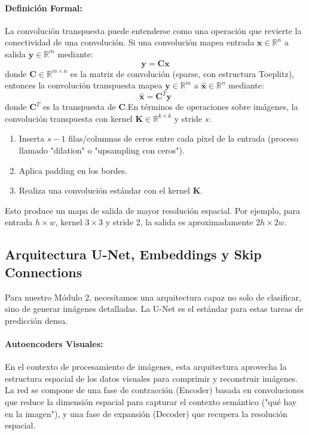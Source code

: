 \documentclass{article}
\begin{document}
\paragraph{Definición Formal:}
La convolución transpuesta puede entenderse como una operación que revierte la conectividad de una convolución. Si una convolución mapea entrada $\mathbf{x} \in \mathbb{R}^{n}$ a salida $\mathbf{y} \in \mathbb{R}^{m}$ mediante:
\begin{equation}
\mathbf{y} = \mathbf{C} \mathbf{x}
\end{equation}
donde $\mathbf{C} \in \mathbb{R}^{m \times n}$ es la matriz de convolución (sparse, con estructura Toeplitz), entonces la convolución transpuesta mapea $\mathbf{y} \in \mathbb{R}^{m}$ a $\hat{\mathbf{x}} \in \mathbb{R}^{n}$ mediante:
\begin{equation}
\hat{\mathbf{x}} = \mathbf{C}^T \mathbf{y}
\end{equation}
donde $\mathbf{C}^T$ es la transpuesta de $\mathbf{C}$.En términos de operaciones sobre imágenes, la convolución transpuesta con kernel $\mathbf{K} \in \mathbb{R}^{k \times k}$ y stride $s$:
\begin{enumerate}
    \item Inserta $s-1$ filas/columnas de ceros entre cada píxel de la entrada (proceso llamado "dilation" o "upsampling con ceros").
    \item Aplica padding en los bordes.
    \item Realiza una convolución estándar con el kernel $\mathbf{K}$.
\end{enumerate}

Esto produce un mapa de salida de mayor resolución espacial. Por ejemplo, para entrada $h \times w$, kernel $3 \times 3$ y stride 2, la salida es aproximadamente $2h \times 2w$.

\subsection{Arquitectura U-Net, Embeddings y Skip Connections}
Para nuestro Módulo 2, necesitamos una arquitectura capaz no solo de clasificar, sino de generar imágenes detalladas. La U-Net es el estándar para estas tareas de predicción densa.

\paragraph{Autoencoders Visuales:}
En el contexto de procesamiento de imágenes, esta arquitectura aprovecha la estructura espacial de los datos visuales para comprimir y reconstruir imágenes. La red se compone de una fase de contracción (Encoder) basada en convoluciones que reduce la dimensión espacial para capturar el contexto semántico ("qué hay en la imagen"), y una fase de expansión (Decoder) que recupera la resolución espacial.
\end{document}
